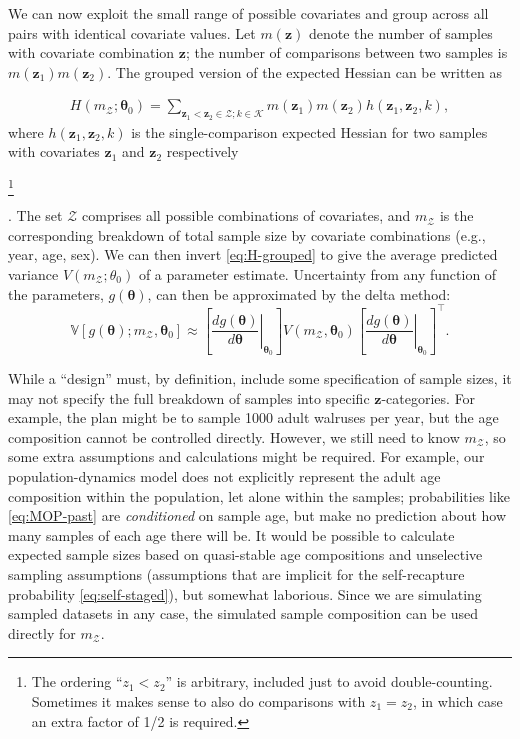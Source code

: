 We can now exploit the small range of possible covariates and group
across all pairs with identical covariate values. Let $m(\mathbf{z})$
denote the number of samples with covariate combination $\mathbf{z}$;
the number of comparisons between two samples is $m\left(\mathbf{z}_{1}\right)m\left(\mathbf{z}_{2}\right)$.
The grouped version of the expected Hessian can be written as 

\begin{gather}
H\left(m_{\mathcal{Z}};\boldsymbol{\theta}_{0}\right)=\sum_{\mathbf{z}_{1}<\mathbf{z}_{2}\in\mathcal{Z};k\in\mathcal{K}}m\left(\mathbf{z}_{1}\right)m\left(\mathbf{z}_{2}\right)h\left(\mathbf{z}_{1},\mathbf{z}_{2},k\right),\label{eq:H-grouped}
\end{gather}
where $h\left(\mathbf{z}_{1},\mathbf{z}_{2},k\right)$ is the single-comparison
expected Hessian for two samples with covariates $\mathbf{z}_{1}$
and $\mathbf{z}_{2}$ respectively%
\begin{lyxgreyedout}
\footnote{The ordering ``$z_{1}<z_{2}$'' is arbitrary, included just to avoid
double-counting. Sometimes it makes sense to also do comparisons with
$z_{1}=z_{2}$, in which case an extra factor of 1/2 is required.}%
\end{lyxgreyedout}
. The set $\mathcal{Z}$ comprises all possible combinations of covariates,
and $m_{\mathcal{Z}}$ is the corresponding breakdown of total sample
size by covariate combinations (e.g., year, age, sex). We can then
invert \eqref{eq:H-grouped} to give the average predicted variance
$V\left(m_{\mathcal{Z}};\theta_{0}\right)$ of a parameter estimate.
Uncertainty from any function of the parameters, $g\left(\boldsymbol{\theta}\right)$,
can then be approximated by the delta method:
\[
\mathbb{V}\left[g\left(\boldsymbol{\theta}\right);m_{\mathcal{Z}},\boldsymbol{\theta}_{0}\right]\approx\left[\left.\frac{dg\left(\boldsymbol{\theta}\right)}{d\boldsymbol{\theta}}\right\vert _{\boldsymbol{\theta}_{0}}\right]V\left(m_{\mathcal{Z}},\boldsymbol{\theta}_{0}\right)\left[\left.\frac{dg\left(\boldsymbol{\theta}\right)}{d\boldsymbol{\theta}}\right\vert _{\boldsymbol{\theta}_{0}}\right]^{\top}.
\]

While a ``design'' must, by definition, include some specification
of sample sizes, it may not specify the full breakdown of samples
into specific $\mathbf{z}$-categories. For example, the plan might
be to sample 1000 adult walruses per year, but the age composition
cannot be controlled directly. However, we still need to know $m_{\mathcal{Z}}$,
so some extra assumptions and calculations might be required. For
example, our population-dynamics model does not explicitly represent
the adult age composition within the population, let alone within
the samples; probabilities like \eqref{eq:MOP-past} are \emph{conditioned}
on sample age, but make no prediction about how many samples of each
age there will be. It would be possible to calculate expected sample
sizes based on quasi-stable age compositions and unselective sampling
assumptions (assumptions that are implicit for the self-recapture
probability \eqref{eq:self-staged}), but somewhat laborious. Since
we are simulating sampled datasets in any case, the simulated sample
composition can be used directly for $m_{\mathcal{Z}}$.

